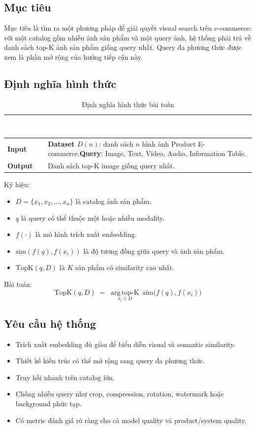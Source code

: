 \documentclass[12pt,a4paper]{article}
\begin{document}
\subsection{Mục tiêu}
Mục tiêu là tìm ra một phương pháp để giải quyết visual search trên e-commerce: với một catalog gồm nhiều ảnh sản phẩm và một query ảnh, hệ thống phải trả về danh sách top-K ảnh sản phẩm giống query nhất. Query đa phương thức được xem là phần mở rộng của hướng tiếp cận này.

\subsection{Định nghĩa hình thức}
\begin{table}[htbp]
\centering
\begin{tabularx}{\linewidth}{@{}L{2.6cm}Y@{}}
\toprule
{}
\textcolor{white}{\textbf{Thành phần}} & \textcolor{white}{\textbf{Mô tả}} \\
\midrule
\textbf{Input} & \textbf{Dataset $D(n)$}: danh sách $n$ hình ảnh Product E-commerce.\newline \textbf{Query}: Image, Text, Video, Audio, Information Table. \\
\textbf{Output} & Danh sách top-K image giống query nhất. \\
\bottomrule
\end{tabularx}
\caption{Định nghĩa hình thức bài toán}
\end{table}

Ký hiệu:
\begin{itemize}
  \item $D = \{x_1, x_2, \dots, x_n\}$ là catalog ảnh sản phẩm.
  \item $q$ là query có thể thuộc một hoặc nhiều modality.
  \item $f(\cdot)$ là mô hình trích xuất embedding.
  \item $\mathrm{sim}(f(q), f(x_i))$ là độ tương đồng giữa query và ảnh sản phẩm.
  \item $\mathrm{TopK}(q, D)$ là $K$ sản phẩm có similarity cao nhất.
\end{itemize}

Bài toán:
\[
\mathrm{TopK}(q, D) \;=\; \operatorname*{arg\,top\text{-}K}_{x_i \in D} \; \mathrm{sim}\bigl(f(q), f(x_i)\bigr)
\]

\subsection{Yêu cầu hệ thống}
\begin{itemize}
  \item Trích xuất embedding đủ giàu để biểu diễn visual và semantic similarity.
  \item Thiết kế kiến trúc có thể mở rộng sang query đa phương thức.
  \item Truy hồi nhanh trên catalog lớn.
  \item Chống nhiễu query như crop, compression, rotation, watermark hoặc background phức tạp.
  \item Có metric đánh giá rõ ràng cho cả model quality và product/system quality.
\end{itemize}
\end{document}
